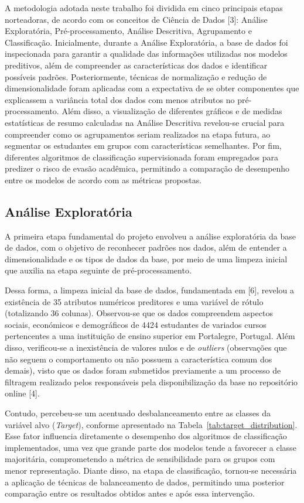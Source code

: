 A metodologia adotada neste trabalho foi dividida em cinco principais etapas norteadoras, de acordo com os conceitos de Ciência de Dados [3]: Análise Exploratória, Pré-processamento, Análise Descritiva, Agrupamento e Classificação. Inicialmente, durante a Análise Exploratória, a base de dados foi inspecionada para garantir a qualidade das informações utilizadas nos modelos preditivos, além de compreender as características dos dados e identificar possíveis padrões. Posteriormente, técnicas de normalização e redução de dimensionalidade foram aplicadas com a expectativa de se obter componentes que explicassem a variância total dos dados com menos atributos no pré-processamento. Além disso, a visualização de diferentes gráficos e de medidas estatísticas de resumo calculadas na Análise Descritiva revelou-se crucial para compreender como os agrupamentos seriam realizados na etapa futura, ao segmentar os estudantes em grupos com características semelhantes. Por fim, diferentes algoritmos de classificação supervisionada foram empregados para predizer o risco de evasão acadêmica, permitindo a comparação de desempenho entre os modelos de acordo com as métricas propostas.

\subsection{Análise Exploratória}
A primeira etapa fundamental do projeto envolveu a análise exploratória da base de dados, com o objetivo de reconhecer padrões nos dados, além de entender a dimensionalidade e os tipos de dados da base, por meio de uma limpeza inicial que auxilia na etapa seguinte de pré-processamento.

Dessa forma, a limpeza inicial da base de dados, fundamentada em [6], revelou a existência de 35 atributos numéricos preditores e uma variável de rótulo (totalizando 36 colunas). Observou-se que os dados compreendem aspectos sociais, económicos e demográficos de 4424 estudantes de variados cursos pertencentes a uma instituição de ensino superior em Portalegre, Portugal. Além disso, verificou-se a inexistência de valores nulos e de \textit{outliers} (observações que não seguem o comportamento ou não possuem a característica comum dos demais), visto que os dados foram submetidos previamente a um processo de filtragem realizado pelos responsáveis pela disponibilização da base no repositório online [4]. 

Contudo, percebeu-se um acentuado desbalanceamento entre as classes da variável alvo (\textit{Target}), conforme apresentado na Tabela~\ref{tab:target_distribution}. Esse fator influencia diretamente o desempenho dos algoritmos de classificação implementados, uma vez que grande parte dos modelos tende a favorecer a classe majoritária, comprometendo a métrica de sensibilidade para os grupos com menor representação. Diante disso, na etapa de classificação, tornou-se necessária a aplicação de técnicas de balanceamento de dados, permitindo uma posterior comparação entre os resultados obtidos antes e após essa intervenção.

